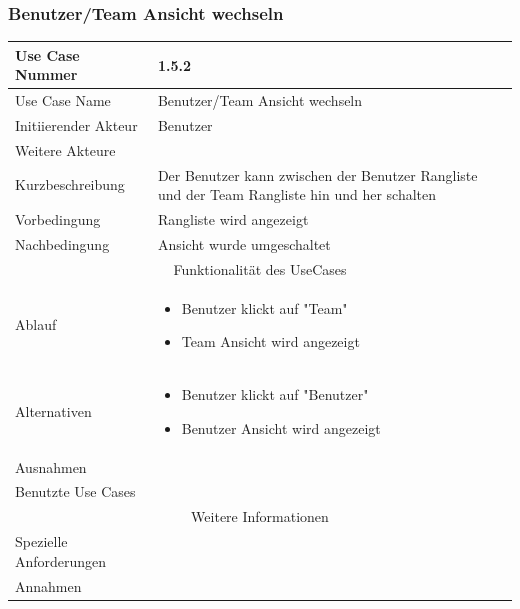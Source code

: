 \documentclass[10pt,a4paper]{article}
\begin{document}
	\subsubsection{Benutzer/Team Ansicht wechseln}
		\begin{tabular}{|l|p{.5\linewidth}|}
		\hline Use Case Nummer & 1.5.2 \\ 
		\hline Use Case Name & Benutzer/Team Ansicht wechseln \\ 
		\hline Initiierender Akteur & Benutzer \\
		\hline Weitere Akteure &  \\
		\hline Kurzbeschreibung & Der Benutzer kann zwischen der Benutzer Rangliste und der Team Rangliste hin und her schalten \\
		\hline Vorbedingung & Rangliste wird angezeigt \\
		\hline Nachbedingung & Ansicht wurde umgeschaltet \\
		\hline \multicolumn{2}{|c|}{Funktionalität des UseCases}\\
		\hline Ablauf & \begin{itemize}
			\item Benutzer klickt auf "Team"
			\item Team Ansicht wird angezeigt
		\end{itemize} \\
		\hline Alternativen & \begin{itemize}
					\item Benutzer klickt auf "Benutzer"
					\item Benutzer Ansicht wird angezeigt
				\end{itemize} \\
		\hline Ausnahmen &  \\
		\hline Benutzte Use Cases &  \\
		\hline \multicolumn{2}{|c|}{Weitere Informationen} \\
		\hline Spezielle Anforderungen &  \\
		\hline Annahmen &  \\
		\hline
		\end{tabular}
		
\end{document}
